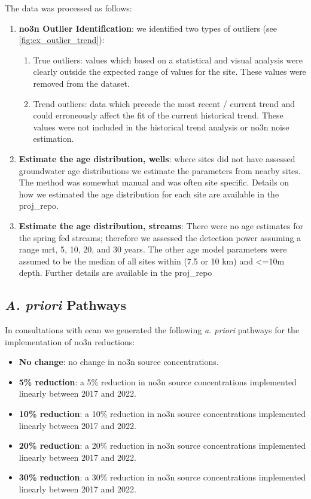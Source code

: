 The data was processed as follows:
\begin{enumerate}
    \item \textbf{\gls{no3n} Outlier Identification}: we identified two types of outliers (see \autoref{fig:ex_outlier_trend}):
    \begin{enumerate}
        \item  True outliers: values which based on a statistical and visual analysis were clearly outside the expected range of values for the site. These values were removed from the dataset.
        \item Trend outliers: data which precede the most recent / current trend and could erroneously affect the fit of the current historical trend. These values were not included in the historical trend analysis or \gls{no3n} noise estimation.
    \end{enumerate}
    \item \textbf{Estimate the age distribution, wells}: where sites did not have assessed groundwater age distributions we estimate the parameters from nearby sites. The method was somewhat manual and was often site specific. Details on how we estimated the age distribution for each site are available in the \gls{proj_repo}.
    \item \textbf{Estimate the age distribution, streams}: There were no age estimates for the spring fed streams; therefore we assessed the detection power assuming a range \gls{mrt}, 5, 10, 20, and 30 years. The other age model parameters were assumed to be the median of all sites within (7.5 or 10 km) and <=10m depth. Further details are available in the \gls{proj_repo}
\end{enumerate}



\subsection[Pathways]{\textit{A. priori} Pathways} \label{subsec:apriori}

In consultations with \gls{ecan} we generated the following \textit{a. priori} pathways for the implementation of \gls{no3n} reductions:
\begin{itemize}
    \item \textbf{No change}: no change in \gls{no3n} source concentrations.
    \item \textbf{5\% reduction}: a 5\% reduction in \gls{no3n} source concentrations implemented linearly between 2017 and 2022.
    \item \textbf{10\% reduction}: a 10\% reduction in \gls{no3n} source concentrations implemented linearly between 2017 and 2022.
    \item \textbf{20\% reduction}: a 20\% reduction in \gls{no3n} source concentrations implemented linearly between 2017 and 2022.
    \item \textbf{30\% reduction}: a 30\% reduction in \gls{no3n} source concentrations implemented linearly between 2017 and 2022.
\end{itemize}

